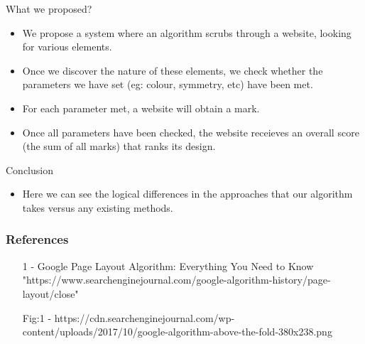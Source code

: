 \documentclass[11pt]{beamer}
\begin{document}
		\begin{frame}{What we proposed?}
			\begin{itemize}
				\item We propose a system where an algorithm scrubs through a website, looking for various elements.
				\item Once we discover the nature of these elements, we check whether the parameters we have set (eg: colour, symmetry, etc) have been met.
				\item For each parameter met, a website will obtain a mark.
				\item Once all parameters have been checked, the website receieves an overall score (the sum of all marks) that ranks its design.
					\end{itemize}	
	\end{frame}
	\begin{frame}{Conclusion}
		\begin{itemize}
			\item Here we can see the logical differences in the approaches that our algorithm takes versus any existing methods.
		\end{itemize}
	\end{frame}
	\begin{frame}
		\frametitle{\LARGE \textbf{References}}
		\begin{itemize}
			\item [1] - Google Page Layout Algorithm: Everything You Need to Know 
			"https://www.searchenginejournal.com/google-algorithm-history/page-layout/close"
			\item [Fig:1] - https://cdn.searchenginejournal.com/wp-content/uploads/2017/10/google-algorithm-above-the-fold-380x238.png
		\end{itemize}
	\end{frame}
\end{document}
